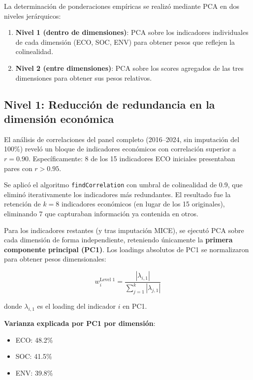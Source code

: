 La determinación de ponderaciones empíricas se realizó mediante PCA en dos niveles jerárquicos:

\begin{enumerate}
    \item \textbf{Nivel 1 (dentro de dimensiones)}: PCA sobre los indicadores individuales de cada dimensión (ECO, SOC, ENV) para obtener pesos que reflejen la colinealidad.
    \item \textbf{Nivel 2 (entre dimensiones)}: PCA sobre los scores agregados de las tres dimensiones para obtener sus pesos relativos.
\end{enumerate}

\subsection{Nivel 1: Reducción de redundancia en la dimensión económica}

El análisis de correlaciones del panel completo (2016--2024, sin imputación del 100\%) reveló un bloque de indicadores económicos con correlación superior a $r = 0.90$. Específicamente: 8 de los 15 indicadores ECO iniciales presentaban pares con $r > 0.95$. 

Se aplicó el algoritmo \texttt{findCorrelation} con umbral de colinealidad de 0.9, que eliminó iterativamente los indicadores más redundantes. El resultado fue la retención de $k = 8$ indicadores económicos (en lugar de los 15 originales), eliminando 7 que capturaban información ya contenida en otros.

Para los indicadores restantes (y tras imputación MICE), se ejecutó PCA sobre cada dimensión de forma independiente, reteniendo únicamente la \textbf{primera componente principal (PC1)}. Los loadings absolutos de PC1 se normalizaron para obtener pesos dimensionales:

\begin{equation}
    w_{i}^{\text{Level 1}} = \frac{|\lambda_{i,1}|}{\sum_{j=1}^{k} |\lambda_{j,1}|}
\end{equation}

donde $\lambda_{i,1}$ es el loading del indicador $i$ en PC1.

\textbf{Varianza explicada por PC1 por dimensión}:
\begin{itemize}
    \item ECO: 48.2\%
    \item SOC: 41.5\%
    \item ENV: 39.8\%
\end{itemize}

